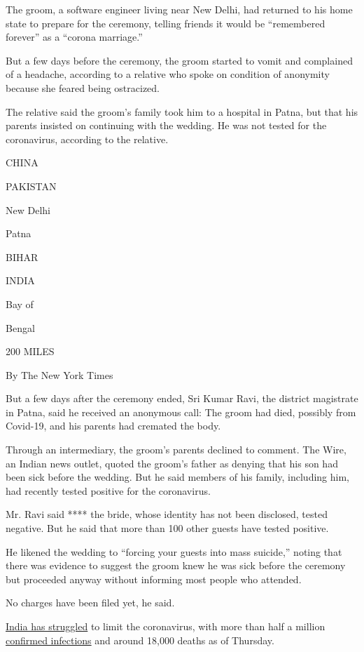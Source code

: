 The groom, a software engineer living near New Delhi, had returned to
his home state to prepare for the ceremony, telling friends it would be
``remembered forever'' as a ``corona marriage.''

But a few days before the ceremony, the groom started to vomit and
complained of a headache, according to a relative who spoke on condition
of anonymity because she feared being ostracized.

The relative said the groom's family took him to a hospital in Patna,
but that his parents insisted on continuing with the wedding. He was not
tested for the coronavirus, according to the relative.

CHINA

PAKISTAN

New Delhi

Patna

BIHAR

INDIA

Bay of

Bengal

200 MILES

By The New York Times

But a few days after the ceremony ended, Sri Kumar Ravi, the district
magistrate in Patna, said he received an anonymous call: The groom had
died, possibly from Covid-19, and his parents had cremated the body.

Through an intermediary, the groom's parents declined to comment. The
Wire, an Indian news outlet, quoted the groom's father as denying that
his son had been sick before the wedding. But he said members of his
family, including him, had recently tested positive for the coronavirus.

Mr. Ravi said **** the bride, whose identity has not been disclosed,
tested negative. But he said that more than 100 other guests have tested
positive.

He likened the wedding to ``forcing your guests into mass suicide,''
noting that there was evidence to suggest the groom knew he was sick
before the ceremony but proceeded anyway without informing most people
who attended.

No charges have been filed yet, he said.

\href{https://www.nytimes.com/2020/05/29/world/asia/coronavirus-india-lockdown.html}{India
has struggled} to limit the coronavirus, with more than half a million
\href{https://www.nytimes.com/interactive/2020/world/asia/india-coronavirus-cases.html}{confirmed
infections} and around 18,000 deaths as of Thursday.

